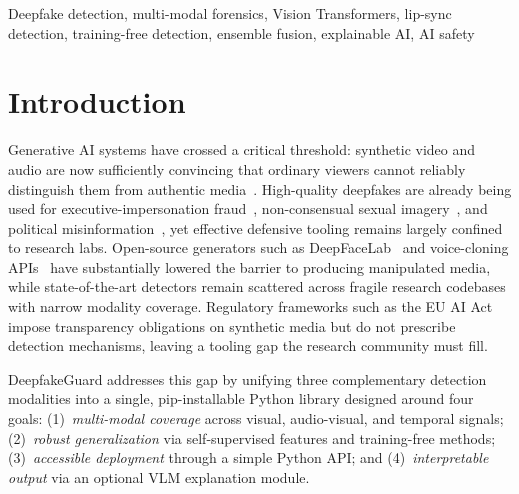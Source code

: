 \documentclass[conference]{IEEEtran}
\begin{document}
\begin{IEEEkeywords}
Deepfake detection, multi-modal forensics, Vision Transformers, lip-sync detection, training-free detection, ensemble fusion, explainable AI, AI safety
\end{IEEEkeywords}


\section{Introduction}

Generative AI systems have crossed a critical threshold: synthetic video and audio are now sufficiently convincing that ordinary viewers cannot reliably distinguish them from authentic media~\cite{ai_safety_report}. High-quality deepfakes are already being used for executive-impersonation fraud~\cite{cnn2024arup}, non-consensual sexual imagery~\cite{sensity2024}, and political misinformation~\cite{ai_safety_report}, yet effective defensive tooling remains largely confined to research labs. Open-source generators such as DeepFaceLab~\cite{deepfacelab} and voice-cloning APIs~\cite{valle} have substantially lowered the barrier to producing manipulated media, while state-of-the-art detectors remain scattered across fragile research codebases with narrow modality coverage. Regulatory frameworks such as the EU AI Act~\cite{eu_ai_act} impose transparency obligations on synthetic media but do not prescribe detection mechanisms, leaving a tooling gap the research community must fill.

DeepfakeGuard addresses this gap by unifying three complementary detection modalities into a single, pip-installable Python library designed around four goals: (1)~\emph{multi-modal coverage} across visual, audio-visual, and temporal signals; (2)~\emph{robust generalization} via self-supervised features and training-free methods; (3)~\emph{accessible deployment} through a simple Python API; and (4)~\emph{interpretable output} via an optional VLM explanation module.
\end{document}
